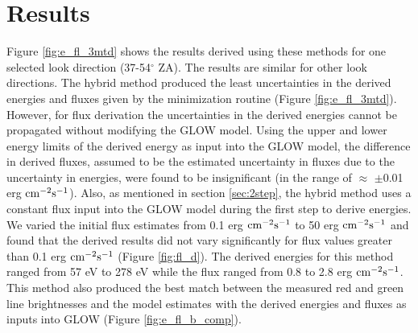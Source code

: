 \documentclass[crop=false,class=mitthesis,oneside,font=12pt]{standalone}
\begin{document}
\section{Results}
Figure \ref{fig:e_fl_3mtd} shows the results derived using these methods for one selected look direction (37-54$^\circ$ ZA). The results are similar for other look directions. The hybrid method produced the least uncertainties in the derived energies and fluxes given by the minimization routine (Figure \ref{fig:e_fl_3mtd}). However, for flux derivation the uncertainties in the derived energies cannot be propagated without modifying the GLOW model. Using the upper and lower energy limits of the derived energy as input into the GLOW model, the difference in derived fluxes, assumed to be the estimated uncertainty in fluxes due to the uncertainty in energies, were found to be insignificant (in the range of $\approx$ $\pm$0.01 erg $\rm cm^{-2} s^{-1}$). Also, as mentioned in section \ref{sec:2step}, the hybrid method uses a constant flux input into the GLOW model during the first step to derive energies. We varied the initial flux estimates from 0.1 erg $\rm cm^{-2} s^{-1}$ to 50 erg $\rm cm^{-2} s^{-1}$ and found that the derived results did not vary significantly for flux values greater than 0.1 erg $\rm cm^{-2} s^{-1}$ (Figure \ref{fig:fl_d}). The derived energies for this method ranged from 57 eV to 278 eV while the flux ranged from 0.8 to 2.8 erg $\rm cm^{-2} s^{-1}$. This method also produced the best match between the measured red and green line brightnesses and the model estimates with the derived energies and fluxes as inputs into GLOW (Figure \ref{fig:e_fl_b_comp}).
\end{document}
